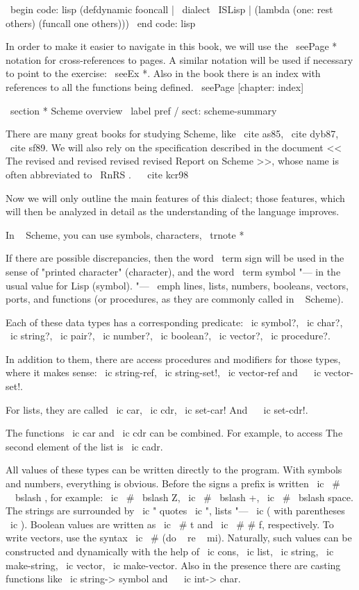 {\ begin {code: lisp}
(defdynamic fooncall | \ dialect { \ ISLisp } |
  (lambda (one: rest others)
    (funcall one others)))
\ end {code: lisp}

In order to make it easier to navigate in this book, we will use
the { \ seePage *} notation for cross-references to pages. A similar notation
will be used if necessary to point to the exercise: { \ seeEx *}. Also
in the book there is an index with references to all the functions being defined.
\ seePage [chapter: index]


\ section * {Scheme overview} \ label {pref / sect: scheme-summary}

There are many great books for studying Scheme, like \ cite {as85},
\ cite {dyb87}, \ cite {sf89}. We will also rely on the specification described
in the document << The revised and revised revised revised Report on Scheme >>,
whose name is often abbreviated to \ RnRS . ~ \ cite {kcr98}

Now we will only outline the main features of this dialect; those features,
which will then be analyzed in detail as the understanding of the language improves.

In ~ Scheme, you can use symbols, characters, \ trnote * {If there are possible discrepancies,
then the word \ term {sign} will be used in the sense of "printed character"
(character), and the word \ term {symbol} "--- in the usual value for Lisp
(symbol). "--- \ emph {lines}, lists, numbers, booleans,
vectors, ports, and functions (or procedures, as they are commonly called in ~ Scheme).

Each of these data types has a corresponding predicate: \ ic {symbol?},
\ ic {char?}, \ ic {string?}, \ ic {pair?}, \ ic {number?}, \ ic {boolean?}, \ ic {vector?},
\ ic {procedure?}.

In addition to them, there are access procedures and modifiers for those types,
where it makes sense: \ ic {string-ref}, \ ic {string-set!}, \ ic {vector-ref}
and ~ \ ic {vector-set!}.

For lists, they are called \ ic {car}, \ ic {cdr}, \ ic {set-car!} And ~ \ ic {set-cdr!}.

The functions \ ic {car} and \ ic {cdr} can be combined. For example, to access
The second element of the list is \ ic {cadr}.

All values ​​of these types can be written directly to the program.
With symbols and numbers, everything is obvious. Before the signs a prefix is ​​written
\ ic { \ # \ \ bslash }, for example: \ ic { \ # \ bslash Z}, \ ic { \ # \ bslash +},
\ ic { \ # \ bslash space}. The strings are surrounded by \ ic {"} quotes \ ic {"}, lists "---
\ ic {(} with parentheses \ ic {)}. Boolean values ​​are written as \ ic { \ # t}
and \ ic { \ # # f}, respectively. To write vectors, use the syntax
\ ic { \ # (do ~ re ~ mi)}. Naturally, such values ​​can be constructed and
dynamically with the help of \ ic {cons}, \ ic {list}, \ ic {string}, \ ic {make-string},
\ ic {vector}, \ ic {make-vector}. Also in the presence there are casting functions
like \ ic {string-> symbol} and ~ \ ic {int-> char}.

}}
